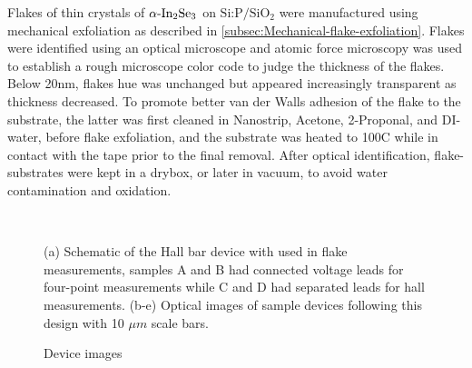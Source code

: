 Flakes of thin crystals of $\textrm{\ensuremath{\alpha}-In}_{2}\textrm{Se}_{3}$
on $\textrm{Si:P/Si}\textrm{O}_{2}$ were manufactured using mechanical
exfoliation as described in \ref{subsec:Mechanical-flake-exfoliation}.
Flakes were identified using an optical microscope and atomic force
microscopy was used to establish a rough microscope color code to
judge the thickness of the flakes. Below 20nm, flakes hue was unchanged
but appeared increasingly transparent as thickness decreased. To promote
better van der Walls adhesion of the flake to the substrate, the latter
was first cleaned in Nanostrip, Acetone, 2-Proponal, and DI-water,
before flake exfoliation, and the substrate was heated to 100C while
in contact with the tape prior to the final removal. After optical
identification, flake-substrates were kept in a drybox, or later in
vacuum, to avoid water contamination and oxidation. 

\noindent 
\begin{figure}
\begin{centering}
\par\end{centering}
\begin{centering}
~~~~~~~~~
\par\end{centering}
\caption{Device images\label{fig:In2Se3-Device-images}}

(a) Schematic of the Hall bar device with used in flake measurements,
samples A and B had connected voltage leads for four-point measurements
while C and D had separated leads for hall measurements. (b-e) Optical
images of sample devices following this design with 10 $\mu m$ scale
bars.
\end{figure}

